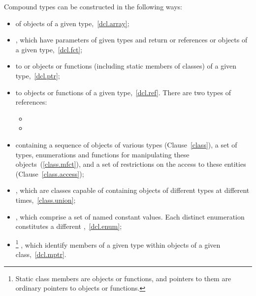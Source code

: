 \pnum
{}%
Compound types can be constructed in the following ways:

\begin{itemize}
\item {}%
 of objects of a given type,~\ref{dcl.array};

\item {}%
, which have parameters of given types and return
 or references or objects of a given type,~\ref{dcl.fct};

\item {}%
 to  or objects or functions (including
static members of classes) of a given type,~\ref{dcl.ptr};

\item %
%
%
%
%
%
 to objects or functions of a given
type,~\ref{dcl.ref}. There are two types of references:
\begin{itemize}
\item {}
\item {}
\end{itemize}

\item {}%
 containing a sequence of objects of various types
(Clause~\ref{class}), a set of types, enumerations and functions for
manipulating these objects~(\ref{class.mfct}), and a set of restrictions
on the access to these entities (Clause~\ref{class.access});

\item {}%
, which are classes capable of containing objects of
different types at different times,~\ref{class.union};

\item {}%
, which comprise a set of named constant values.
Each distinct enumeration constitutes a different
%
,~\ref{dcl.enum};

\item {}%
%
\footnote{Static class members are objects or functions, and pointers to them are
ordinary pointers to objects or functions.}
, which identify members of a given
type within objects of a given class,~\ref{dcl.mptr}.
\end{itemize}


